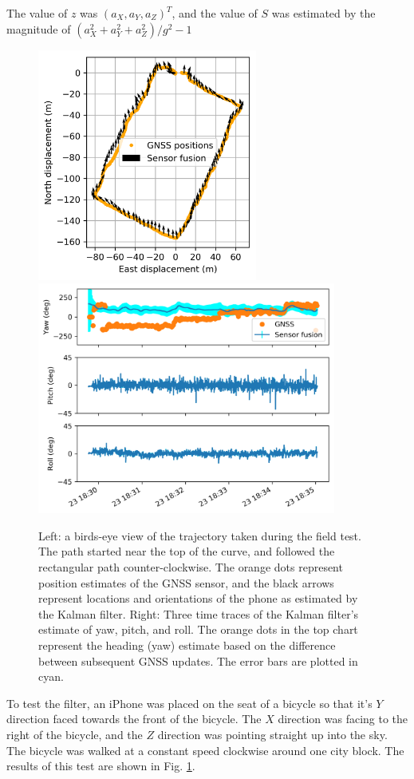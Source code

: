 \documentclass[10pt]{article}
\begin{document}
The value of $z$ was $(a_X, a_Y, a_Z)^T$, and the value of $S$ was estimated by the magnitude of $(a_X^2 + a_Y^2 + a_Z^2)/g^2 - 1$

\begin{figure}
  \centering
  \includegraphics[height=3in]{../images/walk-around-block.png}
  \includegraphics[height=3in]{../images/time-trace-of-bike-path.png}
  \caption{\label{fig:bikewalk} Left: a birds-eye view of the trajectory taken during the field test. The path started near the top of the curve, and followed the rectangular path counter-clockwise. The orange dots represent position estimates of the GNSS sensor, and the black arrows represent locations and orientations of the phone as estimated by the Kalman filter. Right: Three time traces of the Kalman filter's estimate of yaw, pitch, and roll. The orange dots in the top chart represent the heading (yaw) estimate based on the difference between subsequent GNSS updates. The error bars are plotted in cyan.}
\end{figure}

To test the filter, an iPhone was placed on the seat of a bicycle so that it's $Y$ direction faced towards the front of the bicycle. The $X$ direction was facing to the right of the bicycle, and the $Z$ direction was pointing straight up into the sky. The bicycle was walked at a constant speed clockwise around one city block. The results of this test are shown in Fig. \ref{fig:bikewalk}.
\end{document}
